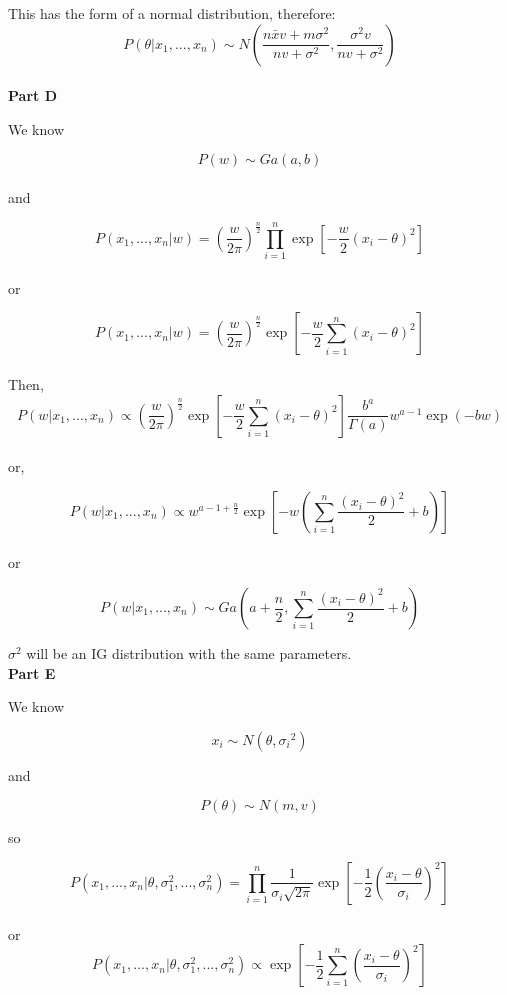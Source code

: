 \documentclass[12pt]{amsart}
\begin{document}
This has the form of a normal distribution, therefore:
$$P(\theta|x_1, ...,x_n) \sim N  \left(\frac{n\bar{x}v+m\sigma^2}{nv+\sigma^2},  \frac{\sigma^2v}{nv+\sigma^2}  \right)$$\\

{\bf Part D} \\
\bigskip

We know

$$P(w) \sim Ga(a,b)$$\\

and 

$$P(x_1, ..., x_n|w) =  \left(\frac{w}{2\pi}\right)^{\frac{n}{2}}\prod_{i=1}^{n}\exp \left[ -\frac{w}{2}(x_i-\theta)^2 \right] $$\\

or 

$$P(x_1, ..., x_n|w) =  \left(\frac{w}{2\pi}\right)^{\frac{n}{2}}\exp \left[ -\frac{w}{2} \sum_{i=1}^{n}(x_i-\theta)^2 \right] $$\\

Then,
$$P(w|x_1, ..., x_n) \propto  \left(\frac{w}{2\pi}\right)^{\frac{n}{2}}\exp \left[ -\frac{w}{2} \sum_{i=1}^{n}(x_i-\theta)^2 \right] \frac{b^a}{\Gamma(a)}w^{a-1}\exp(-bw) $$\\

or,

$$P(w|x_1, ..., x_n) \propto  w^{a-1+\frac{n}{2}}\exp \left[ -w \left( \sum_{i=1}^{n}\frac{(x_i-\theta)^2}{2} +b \right)\right]  $$\\

or


$$P(w|x_1, ..., x_n) \sim Ga\left(a+\frac{n}{2}, \sum_{i=1}^{n}\frac{(x_i-\theta)^2}{2} +b  \right)$$

$\sigma^2$ will be an IG distribution with the same parameters.\\


{\bf Part E} \\
\bigskip

We know

$$ x_i \sim N(\theta, {\sigma_i}^2)$$


and 

$$ P(\theta) \sim N(m,v)$$

so

$$ P(x_1, ..., x_n | \theta, \sigma_1^2, ..., \sigma_n^2) = \prod_{i=1}^{n} \frac{1}{\sigma_i \sqrt{2\pi}}\exp\left[-\frac{1}{2}\left(\frac{x_i-\theta}{\sigma_i}\right)^2\right] $$\\
or
$$ P(x_1, ..., x_n | \theta, \sigma_1^2, ..., \sigma_n^2) \propto  \exp\left[-\frac{1}{2}\sum_{i=1}^{n}\left(\frac{x_i-\theta}{\sigma_i}\right)^2\right] $$\\
\end{document}

